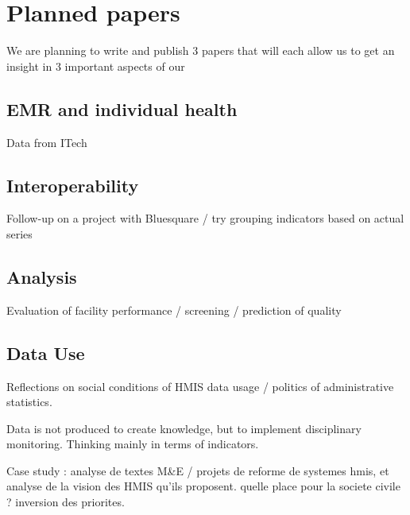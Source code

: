\documentclass[a4paper,11pt,final,twoside]{article}
\begin{document}
\section{Planned papers}

We are planning to write and publish 3 papers that will each allow us to get an insight in 3 important aspects of our 

	\subsection{EMR and individual health}

Data from ITech

	\subsection{Interoperability }
 
Follow-up on a project with Bluesquare  / try grouping indicators based on actual series
 
	\subsection{Analysis}  
  
Evaluation of facility performance / screening / prediction of quality

	\subsection{Data Use}
  
Reflections on social conditions of HMIS data usage  / politics of administrative statistics.

Data is not produced to create knowledge, but to implement disciplinary monitoring. Thinking mainly in terms of indicators. 

Case study : analyse de textes M\&E / projets de reforme de systemes hmis, et analyse de la vision des HMIS qu'ils proposent. quelle place pour la societe civile ? inversion des priorites. 
  
\newpage

\end{document}
